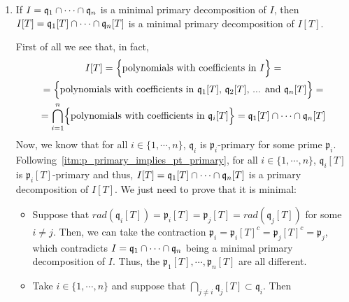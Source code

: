 \begin{problem}
\begin{enumerate}[label=(\theproblem.\arabic*),ref=\theproblem.\arabic*]
\begin{sol}
\begin{proof}
            \end{proof}


        \end{sol}

        \item If $I = \mathfrak{q}_1 \cap \cdots \cap \mathfrak{q}_n$ is a minimal primary decomposition of $I$, then $I[T] = \mathfrak{q}_1[T] \cap \cdots \cap \mathfrak{q}_n[T]$ is a minimal primary decomposition of $I[T]$.
        \begin{sol}
            First of all we see that, in fact,
            \begin{gather*}
                I[T] = \Bigl\{ \text{polynomials with coefficients in } I \Bigr\} =\\
                = \Bigl\{ \text{polynomials with coefficients in } \mathfrak{q}_1[T] \text{, } \mathfrak{q}_2[T] \text{, ... and } \mathfrak{q}_n[T] \Bigr\} =\\
                = \bigcap_{i=1}^n \Bigl\{ \text{polynomials with coefficients in } \mathfrak{q}_i[T] \Bigr\} = \mathfrak{q}_1[T] \cap \cdots \cap \mathfrak{q}_n[T]\\
            \end{gather*}
            Now, we know that for all $i \in \{ 1, \cdots, n \}$, $\mathfrak{q}_i$ is $\mathfrak{p}_i$-primary for some prime $\mathfrak{p}_i$.
            Following~\ref{itm:p_primary_implies_pt_primary}, for all $i \in \{ 1, \cdots, n \}$, $\mathfrak{q}_i[T]$ is $\mathfrak{p}_i[T]$-primary and thus, $I[T] = \mathfrak{q}_1[T] \cap \cdots \cap \mathfrak{q}_n[T]$ is a primary decomposition of $I[T]$.
            We just need to prove that it is minimal:
            \begin{itemize}
                \item
                Suppose that $rad(\mathfrak{q}_i[T]) = \mathfrak{p}_i[T] = \mathfrak{p}_j[T] = rad(\mathfrak{q}_j[T])$ for some $i \neq j$.
                Then, we can take the contraction $\mathfrak{p}_i = \mathfrak{p}_i[T]^c = \mathfrak{p}_j[T]^c = \mathfrak{p}_j$, which contradicts $I = \mathfrak{q}_1 \cap \cdots \cap \mathfrak{q}_n$ being a minimal primary decomposition of $I$.
                Thus, the $\mathfrak{p}_1[T], \cdots, \mathfrak{p}_n[T]$ are all different.
                \item
                Take $i \in \{ 1, \cdots, n \}$ and suppose that $\bigcap_{j \neq i} \mathfrak{q}_j[T] \subset \mathfrak{q}_i$.
                Then
                \begin{gather*}

\end{gather*}
\end{itemize}
\end{sol}
\end{enumerate}
\end{problem}
